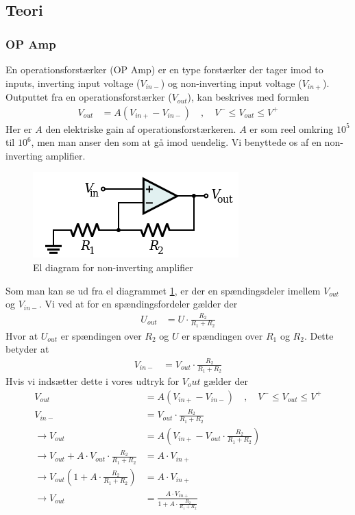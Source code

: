 \subsection{Teori}
\subsubsection{OP Amp}

En operationsforstærker (OP Amp) er en type forstærker der tager imod to inputs, inverting input voltage ($V_{in-}$) og non-inverting input voltage ($V_{in+}$). Outputtet fra en operationsforstærker  ($V_{out}$), kan beskrives med formlen
\begin{align}
V_{out}&=A(V_{in+}-V_{in-})\quad,\quad V^- \leq V_{out}\leq V^+ 
\end{align}
Her er $A$ den elektriske gain af operationsforstærkeren. $A$ er som reel omkring $10^5$ til $10^6$, men man anser den som at gå imod uendelig. Vi benyttede os af en non-inverting amplifier. 
\begin{figure}[H]
	\centering
    \includegraphics[width=\textwidth]{figures/komponenter/NonInvAmp}
	\caption{El diagram for non-inverting amplifier}
	\label{fig:noninvamp}	
\end{figure}
Som man kan se ud fra el diagrammet \ref{fig:noninvamp}, er der en spændingsdeler imellem $V_{out}$ og $V_{in-}$. Vi ved at for en spændingsfordeler gælder der
\begin{align}
U_{out}&=U\cdot \frac{R_2}{R_1+R_2}
\end{align}
Hvor at $U_{out}$ er spændingen over $R_2$ og $U$ er spændingen over $R_1$ og $R_2$.
Dette betyder at
\begin{align}
V_{in-}&=V_{out}\cdot \frac{R_2}{R_1+R_2}
\end{align}
Hvis vi indsætter dette i vores udtryk for $V_out$ gælder der
\begin{align}
V_{out}&=A(V_{in+}-V_{in-})\quad,\quad V^- \leq V_{out}\leq V^+\\
V_{in-}&=V_{out}\cdot \frac{R_2}{R_1+R_2}\\
\rightarrow V_{out}&= A(V_{in+}-V_{out}\cdot \frac{R_2}{R_1+R_2})\\
\rightarrow V_{out}+A\cdot V_{out}\cdot \frac{R_2}{R_1+R_2}&=A\cdot V_{in+}\\
\rightarrow V_{out}(1+A\cdot \frac{R_2}{R_1+R_2})&=A\cdot V_{in+}\\
\rightarrow V_{out}&=\frac{A\cdot V_{in+}}{1+A\cdot \frac{R_2}{R_1+R_2}}\\
\end{align}
